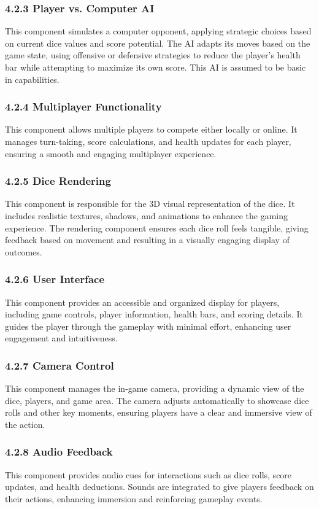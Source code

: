 \documentclass{article}
\begin{document}
\subsubsection*{4.2.3 Player vs. Computer AI}
This component simulates a computer opponent, applying strategic choices based on current dice values and score potential. The AI adapts its moves based on the game state, using offensive or defensive strategies to reduce the player's health bar while attempting to maximize its own score. This AI is assumed to be basic in capabilities.

\subsubsection*{4.2.4 Multiplayer Functionality}
This component allows multiple players to compete either locally or online. It manages turn-taking, score calculations, and health updates for each player, ensuring a smooth and engaging multiplayer experience.

\subsubsection*{4.2.5 Dice Rendering}
This component is responsible for the 3D visual representation of the dice. It includes realistic textures, shadows, and animations to enhance the gaming experience. The rendering component ensures each dice roll feels tangible, giving feedback based on movement and resulting in a visually engaging display of outcomes.

\subsubsection*{4.2.6 User Interface}
This component provides an accessible and organized display for players, including game controls, player information, health bars, and scoring details. It guides the player through the gameplay with minimal effort, enhancing user engagement and intuitiveness.

\subsubsection*{4.2.7 Camera Control}
This component manages the in-game camera, providing a dynamic view of the dice, players, and game area. The camera adjusts automatically to showcase dice rolls and other key moments, ensuring players have a clear and immersive view of the action.

\subsubsection*{4.2.8 Audio Feedback}
This component provides audio cues for interactions such as dice rolls, score updates, and health deductions. Sounds are integrated to give players feedback on their actions, enhancing immersion and reinforcing gameplay events.
\end{document}
